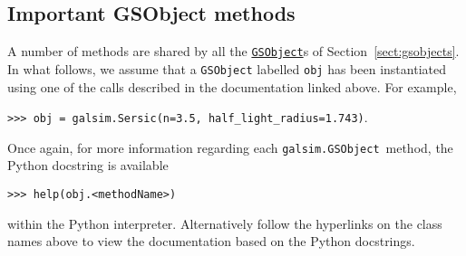 \documentclass[preprint,10pt]{../../devel/modules/aastex}
\newcommand\GSObject{\href{http://galsim-developers.github.io/GalSim/classgalsim_1_1base_1_1_g_s_object.html}{\texttt{GSObject}}}
\begin{document}
\subsection{Important GSObject methods}\label{sect:gsobjectmethods}
A number of methods are shared by all the \GSObject s of
Section~\ref{sect:gsobjects}.
In what follows, we assume that a
\texttt{GSObject} labelled \texttt{obj} has been instantiated using
one of the calls described in the documentation linked above.  For
example,

\texttt{>>> obj = galsim.Sersic(n=3.5, half\_light\_radius=1.743)}.

Once again, for more information regarding each \texttt{galsim.GSObject}~method,
the Python docstring is available

\texttt{>>> help(obj.<methodName>)}

within the Python interpreter.  Alternatively follow the hyperlinks on
the class names above to view the documentation based
on the Python docstrings.
\end{document}
